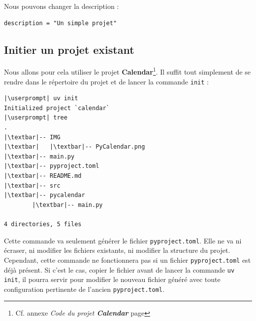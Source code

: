 Nous pouvons changer la description :
\begin{lstlisting}[style=file]
description = "Un simple projet"
\end{lstlisting}


\subsection*{Initier un projet existant}
Nous allons pour cela utiliser le projet \textbf{Calendar}\footnote{Cf. annexe \textit{Code du projet \textbf{Calendar}} page \pageref{code_calendar}}. Il suffit tout simplement de se rendre dans le répertoire du projet et de lancer la commande \texttt{init} :
\begin{lstlisting}[style=bash]
|\userprompt| uv init
Initialized project `calendar`
|\userprompt| tree  
.
|\textbar|-- IMG
|\textbar|   |\textbar|-- PyCalendar.png
|\textbar|-- main.py
|\textbar|-- pyproject.toml
|\textbar|-- README.md
|\textbar|-- src
|\textbar|-- pycalendar
        |\textbar|-- main.py

4 directories, 5 files
\end{lstlisting}

Cette commande va seulement générer le fichier \texttt{pyproject.toml}. Elle ne va ni écraser, ni modifier les fichiers existants, ni modifier la structure du projet. Cependant, cette commande ne fonctionnera pas si un fichier \texttt{pyproject.toml} est déjà présent. Si c'est le cas, copier le fichier avant de lancer la commande \texttt{uv init}, il pourra servir pour modifier le nouveau fichier généré avec toute configuration pertinente de l'ancien \texttt{pyproject.toml}.

